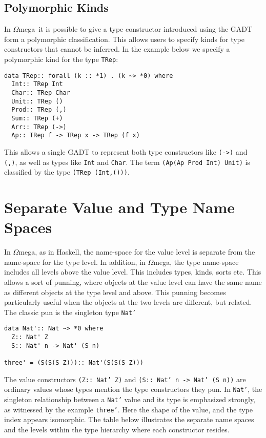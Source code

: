 \documentclass[11pt,twoside]{article}
\newcommand{\om}{$\Omega$mega}
\begin{document}
\subsection{Polymorphic Kinds}
In \om\ it is possible to give a type constructor
introduced using the GADT form a polymorphic classification.
This allows users to specify kinds
for type constructors that cannot be inferred. In the example
below we specify a polymorphic kind for the type {\tt TRep}:
\begin{verbatim}
data TRep:: forall (k :: *1) . (k ~> *0) where
  Int:: TRep Int
  Char:: TRep Char
  Unit:: TRep ()
  Prod:: TRep (,)
  Sum:: TRep (+)
  Arr:: TRep (->)
  Ap:: TRep f -> TRep x -> TRep (f x)
\end{verbatim}
This allows a single GADT to represent both type constructors like
\verb+(->)+ and \verb+(,)+, as well as types like \verb+Int+ and \verb+Char+.
The term \verb+(Ap(Ap Prod Int) Unit)+ is classified
by the type \verb+(TRep (Int,()))+.

\section{Separate Value and Type Name Spaces}

In \om, as in Haskell, the name-space for the value level is separate from the
name-space for the type level.  In addition, in \om, the type name-space
includes all levels above the value level. This includes types, kinds, sorts
etc. This allows a sort of punning, where objects at the value level can have
the same name as different objects at the type level and above. This punning
becomes particularly useful when the objects at the two levels are different,
but related. The classic pun is the singleton type {\tt Nat'}

\begin{verbatim}
data Nat':: Nat ~> *0 where
  Z:: Nat' Z
  S:: Nat' n -> Nat' (S n)

three' = (S(S(S Z))):: Nat'(S(S(S Z)))
\end{verbatim}

The value constructors {\tt (Z:: Nat' Z)} and {\tt (S:: Nat' n ->
Nat' (S n))} are ordinary values whose types mention the type
constructors they pun. In {\tt Nat'}, the singleton relationship
between a {\tt Nat'} value and its type is emphasized
strongly, as witnessed by the example {\tt three'}. Here the
shape of the value, and the type index appears isomorphic. The table
below illustrates the separate name spaces and the levels within the type
hierarchy where each constructor resides.
\end{document}
